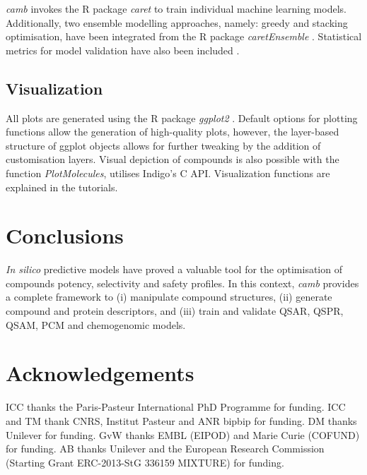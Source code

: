 \documentclass{bioinfo}
\begin{document}
{\it camb} invokes the R package {\it caret} to 
train individual machine learning models.
Additionally, two ensemble modelling approaches, namely: greedy and stacking optimisation,
have been integrated from the R package {\it caretEnsemble} \citep{caretEnsemble}.
Statistical metrics for model validation have also been included \citep{beware}.

\subsection{Visualization}
All plots are generated using the R package {\it ggplot2} \citep{ggplot2}.
Default options for plotting functions allow the generation of 
high-quality plots,
however, the layer-based structure of ggplot objects allows for further tweaking
by the addition of customisation layers.  
Visual depiction of compounds is also possible with the function {\it PlotMolecules},
utilises Indigo's C API.
Visualization functions are explained in the tutorials.

\section{Conclusions}
{\it In silico} predictive models have proved a valuable
tool for the optimisation of compounds potency, selectivity and safety profiles.
In this context, {\it camb} provides a complete framework
to (i) manipulate compound structures, (ii) generate compound and protein descriptors, and
(iii) train and validate 
QSAR, QSPR, QSAM, PCM and chemogenomic models.

\section{Acknowledgements}
ICC thanks the Paris-Pasteur International PhD Programme for funding.
ICC and TM thank CNRS, Institut Pasteur and ANR bipbip for funding.
DM thanks Unilever for funding.
GvW thanks EMBL (EIPOD) and Marie Curie (COFUND) for funding.
AB thanks Unilever and the European Research Commission (Starting Grant ERC-2013-StG 336159 MIXTURE) for funding.



\end{document}
